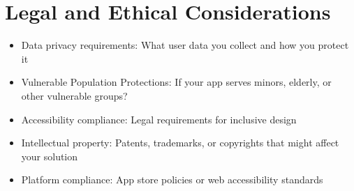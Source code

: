 \section{Legal and Ethical Considerations}
\begin{itemize}
    \item Data privacy requirements: What user data you collect and how you protect it
    \item Vulnerable Population Protections: If your app serves minors, elderly, or other vulnerable groups?
    \item Accessibility compliance: Legal requirements for inclusive design
    \item Intellectual property: Patents, trademarks, or copyrights that might affect your solution
    \item Platform compliance: App store policies or web accessibility standards
\end{itemize}